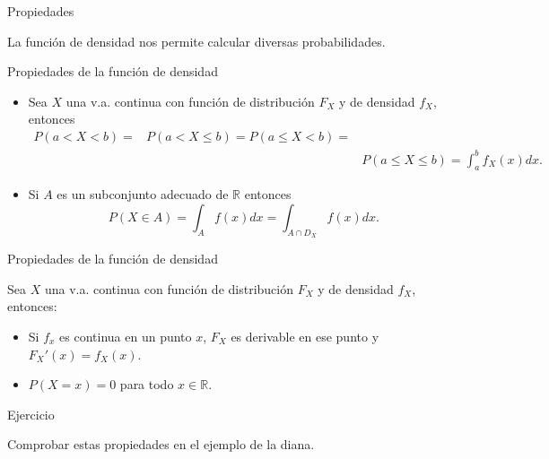 \documentclass[
  letterpaper,
  DIV=11,
  numbers=noendperiod]{scrreprt}
\providecommand{\tightlist}{%
  \setlength{\itemsep}{0pt}\setlength{\parskip}{0pt}}\usepackage{longtable,booktabs,array}
\begin{document}
\begin{Proposicion}{Propiedades}{}

La función de densidad nos permite calcular diversas probabilidades.

Propiedades de la función de densidad

\begin{itemize}
\item
  Sea \(X\) una v.a. continua con función de distribución \(F_X\) y de
  densidad \(f_X\), entonces \begin{align*}
  P(a< X< b) = &   P(a<X\leq b)= P(a\leq X< b)=\\
   & & P(a\leq X\leq b)= \displaystyle\int_{a}^b f_X(x) dx.
  \end{align*}
\item
  Si \(A\) es un subconjunto adecuado de \(\mathbb{R}\) entonces
  \[P(X\in A)=\displaystyle\int_{A} f(x) dx=\displaystyle\int_{A\cap D_X} f(x) dx.
  \]
\end{itemize}

Propiedades de la función de densidad

Sea \(X\) una v.a. continua con función de distribución \(F_X\) y de
densidad \(f_X\), entonces:

\begin{itemize}
\tightlist
\item
  Si \(f_x\) es continua en un punto \(x\), \(F_X\) es derivable en ese
  punto y \(F_X'(x)=f_X(x).\)
\item
  \(P(X=x)=0\) para todo \(x\in\mathbb{R}.\)
\end{itemize}

\end{Proposicion}

\begin{Ejercicio}{Ejercicio}{}

Comprobar estas propiedades en el ejemplo de la diana.

\end{Ejercicio}
\end{document}
